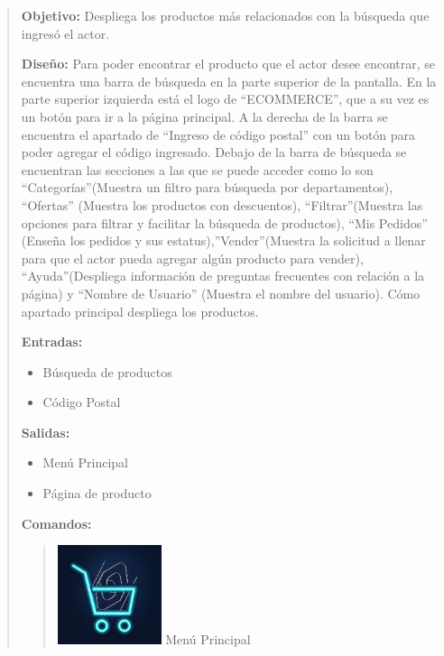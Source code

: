 \documentclass[14pt]{article}
\begin{document}
                \begin{quote}
                    \textbf{Objetivo:} Despliega los productos más relacionados con la búsqueda que ingresó el actor.
                    
                    \textbf{Diseño:} Para poder encontrar el producto que el actor desee encontrar, se encuentra una barra de búsqueda en la parte superior de la pantalla. En la parte superior izquierda está el logo de “ECOMMERCE”, que a su vez es un botón para ir a la página principal.  A la derecha de la barra se encuentra el apartado de “Ingreso de código postal” con un botón para poder agregar el código ingresado. Debajo de la barra de búsqueda se encuentran las secciones a las que se puede acceder como lo son “Categorías”(Muestra un filtro para búsqueda por departamentos), “Ofertas” (Muestra los productos con descuentos), “Filtrar”(Muestra las opciones para filtrar y facilitar la búsqueda de productos), “Mis Pedidos” (Enseña los pedidos y sus estatus),”Vender”(Muestra la solicitud a llenar para que el actor pueda agregar algún producto para vender), “Ayuda”(Despliega información de preguntas frecuentes con relación a la página) y “Nombre de Usuario” (Muestra el nombre del usuario). Cómo apartado principal despliega los productos.
                    
                    \textbf{Entradas:} 
                        \begin{itemize}
                            \item Búsqueda de productos
                            \item Código Postal
                        \end{itemize}
                    
                    \textbf{Salidas:}
                        \begin{itemize}
                            \item Menú Principal
                            \item Página de producto
                        \end{itemize}
                        
                    \textbf{Comandos:}
                        \begin{quote}
                            \includegraphics[height=0.02\textwidth]{BotonMenuPrincipal.jpg}
                            \label{P4:BotonMenuPrincipal} Menú Principal
                           

\end{quote}
\end{quote}
\end{document}
